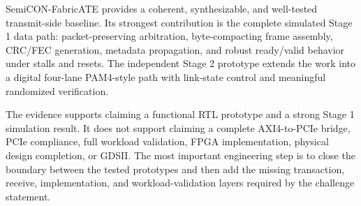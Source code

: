 \documentclass[11pt,a4paper]{article}
\begin{document}
SemiCON-FabricATE provides a coherent, synthesizable, and well-tested transmit-side
baseline. Its strongest contribution is the complete simulated Stage 1 data path:
packet-preserving arbitration, byte-compacting frame assembly, CRC/FEC generation, metadata
propagation, and robust ready/valid behavior under stalls and resets. The independent
Stage 2 prototype extends the work into a digital four-lane PAM4-style path with link-state
control and meaningful randomized verification.

The evidence supports claiming a functional RTL prototype and a strong Stage 1 simulation
result. It does not support claiming a complete AXI4-to-PCIe bridge, PCIe compliance, full
workload validation, FPGA implementation, physical design completion, or GDSII. The most
important engineering step is to close the boundary between the tested prototypes and then
add the missing transaction, receive, implementation, and workload-validation layers
required by the challenge statement.
\end{document}

